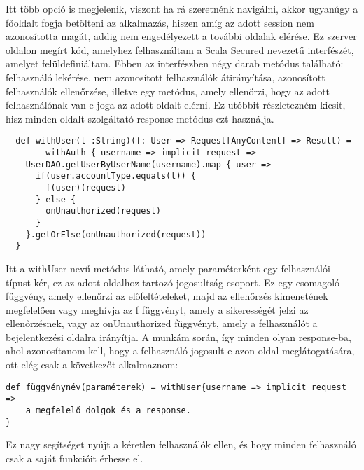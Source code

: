 Itt több opció is megjelenik, viszont ha rá szeretnénk navigálni, akkor ugyanúgy a főoldalt fogja betölteni az alkalmazás, hiszen amíg az adott session nem azonosította magát, addig nem engedélyezett a további oldalak elérése. Ez szerver oldalon megírt kód, amelyhez felhasználtam a Scala Secured nevezetű interfészét, amelyet felüldefiniáltam. Ebben az interfészben négy darab metódus található: felhasználó lekérése, nem azonosított felhasználók átirányítása, azonosított felhasználók ellenőrzése, illetve egy metódus, amely ellenőrzi, hogy az adott felhasználónak van-e joga az adott oldalt elérni. Ez utóbbit részletezném kicsit, hisz minden oldalt szolgáltató response metódus ezt használja.
\begin{verbatim}
  def withUser(t :String)(f: User => Request[AnyContent] => Result) =
        withAuth { username => implicit request =>
    UserDAO.getUserByUserName(username).map { user =>
      if(user.accountType.equals(t)) {
        f(user)(request)
      } else {
        onUnauthorized(request)
      }
    }.getOrElse(onUnauthorized(request))
  }
\end{verbatim}
Itt a withUser nevű metódus látható, amely paraméterként egy felhasználói típust kér, ez az adott oldalhoz tartozó jogosultság csoport. Ez egy csomagoló függvény, amely ellenőrzi az előfeltételeket, majd az ellenőrzés kimenetének megfelelően vagy meghívja az f függvényt, amely a sikerességét jelzi az ellenőrzésnek, vagy az onUnauthorized függvényt, amely a felhasználót a bejelentkezési oldalra irányítja. A munkám során, így minden olyan response-ba, ahol azonosítanom kell, hogy a felhasználó jogosult-e azon oldal meglátogatására, ott elég csak a következőt alkalmaznom:
\begin{verbatim}
def függvénynév(paraméterek) = withUser{username => implicit request =>
    a megfelelő dolgok és a response.
}
\end{verbatim}
Ez nagy segítséget nyújt a kéretlen felhasználók ellen, és hogy minden felhasználó csak a saját funkcióit érhesse el.

